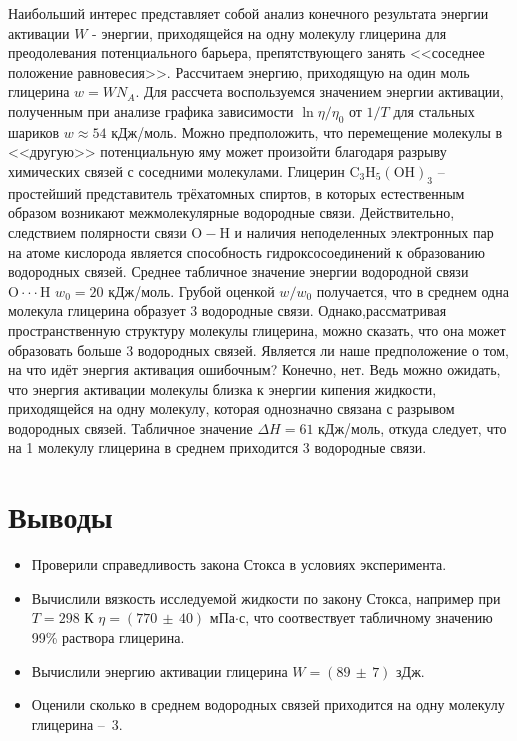 \documentclass[a4paper,12pt]{article} %
\begin{document}
	Наибольший интерес представляет собой анализ конечного результата энергии активации $W$ - энергии, приходящейся на одну молекулу глицерина для преодолевания потенциального барьера, препятствующего занять <<соседнее положение равновесия>>. Рассчитаем энергию, приходящую на один моль глицерина $w = W N_A$. Для рассчета воспользуемся значением энергии активации, полученным при анализе графика зависимости $\ln{\eta / \eta_0}$ от $1 / T$ для стальных шариков $w \approx 54$ кДж/моль. Можно предположить, что перемещение молекулы в <<другую>> потенциальную яму может произойти благодаря разрыву химических связей с соседними молекулами. Глицерин $\mathrm{C_3 H_5 (OH)_3}$ -- простейший представитель трёхатомных спиртов, в которых естественным образом возникают межмолекулярные водородные связи. Действительно, следствием полярности связи $\mathrm{O \! - \! H}$ и наличия неподеленных электронных пар на атоме кислорода является способность гидроксосоединений к образованию водородных связей. Среднее табличное значение энергии водородной связи $\mathrm{O \! \cdot \cdot \cdot \! H}$ $w_0 = 20$ кДж/моль. Грубой оценкой $w / w_0$ получается, что в среднем одна молекула глицерина образует 3 водородные связи. Однако,рассматривая пространственную структуру молекулы глицерина, можно сказать, что она может образовать больше 3 водородных связей. Является ли наше предположение о том, на что идёт энергия активация ошибочным? Конечно, нет. Ведь можно ожидать, что энергия активации молекулы близка к энергии кипения жидкости, приходящейся на одну молекулу, которая однозначно связана с разрывом водородных связей. Табличное значение $\Delta H = 61$ кДж/моль, откуда следует, что на 1 молекулу глицерина в среднем приходится 3 водородные связи.
	
\section*{Выводы}
	\begin{itemize}
		\item Проверили справедливость закона Стокса в условиях эксперимента.
		\item Вычислили вязкость исследуемой жидкости по закону Стокса, например при $T = 298$ К $\eta = (770\, \pm \, 40)$ мПа$\cdot$с, что соотвествует табличному значению 99\% раствора глицерина.
		\item Вычислили энергию активации глицерина $W =(89 \, \pm \, 7)$ зДж.
		\item Оценили сколько в среднем водородных связей приходится на одну молекулу глицерина --~3.
	\end{itemize}
	
	
	
	
	
	
	
	
	
	
	
	
	
	
	
	
	
	
	
	
	
	
	
	
	
	
	
	
	
	
	
\end{document}
